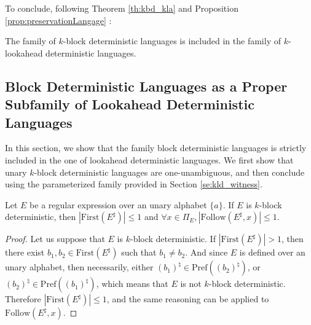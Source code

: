 \documentclass{llncs}
\begin{document}
To conclude, following Theorem \ref{th:kbd_kla} and Proposition \ref{prop:preservationLangage} :

\begin{theorem}
	The family of $k$-block deterministic languages is included in the family of $k$-lookahead deterministic languages.
\end{theorem}



\subsection{Block Deterministic Languages as a Proper Subfamily of Lookahead Deterministic Languages}

	In this section, we show that the family block deterministic languages is strictly included in the one of lookahead deterministic languages.
	We first show that unary $k$-block deterministic languages are one-unambiguous, and then conclude using the parameterized family provided in Section \ref{se:kld_witness}.

\begin{proposition}
	Let $E$ be a regular expression over an unary alphabet $\{a\}$.
	If $E$ is $k$-block deterministic, then $|\mathrm{First}(E^{\sharp})| \leq 1$ and $\forall x \in \Pi_E, |\mathrm{Follow}(E^{\sharp}, x)| \leq 1$.
\end{proposition}
\begin{proof}
	Let us suppose that $E$ is $k$-block deterministic.
	If $|\mathrm{First}(E^{\sharp})| > 1$, then there exist $b_1, b_2 \in \mathrm{First}(E^{\sharp})$ such that $b_1 \neq b_2$.
	And since $E$ is defined over an unary alphabet, then necessarily, either $(b_1)^{\natural} \in \mathrm{Pref}((b_2)^{\natural})$, or $(b_2)^{\natural} \in \mathrm{Pref}((b_1)^{\natural})$, which means that $E$ is not $k$-block deterministic.
	Therefore $|\mathrm{First}(E^{\sharp})| \leq 1$, and the same reasoning can be applied to $\mathrm{Follow}(E^{\sharp}, x)$.
\end{proof}
\end{document}
